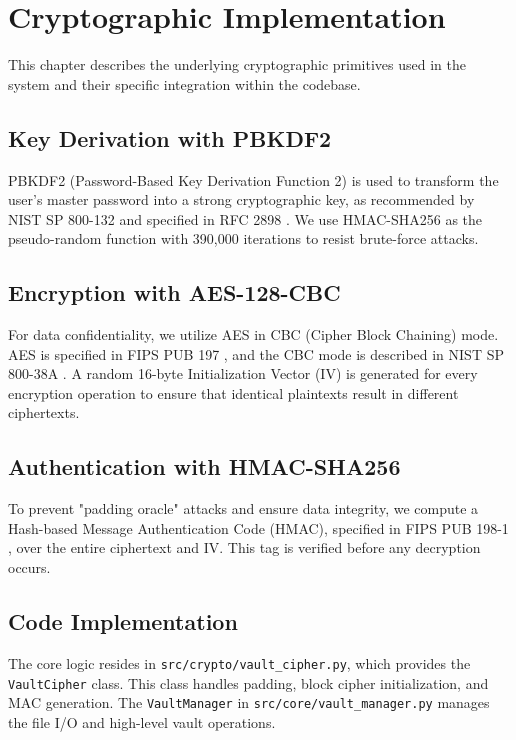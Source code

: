 \chapter{Cryptographic Implementation}
\label{ch:implementation}

This chapter describes the underlying cryptographic primitives used in the system and their specific integration within the codebase.

\section{Key Derivation with PBKDF2}
PBKDF2 (Password-Based Key Derivation Function 2) is used to transform the user's master password into a strong cryptographic key, as recommended by NIST SP 800-132 \cite{nist800132} and specified in RFC 2898 \cite{rfc2898}. We use HMAC-SHA256 as the pseudo-random function with 390,000 iterations to resist brute-force attacks.

\section{Encryption with AES-128-CBC}
For data confidentiality, we utilize AES in CBC (Cipher Block Chaining) mode. AES is specified in FIPS PUB 197 \cite{fips197}, and the CBC mode is described in NIST SP 800-38A \cite{nist80038a}. A random 16-byte Initialization Vector (IV) is generated for every encryption operation to ensure that identical plaintexts result in different ciphertexts.

\section{Authentication with HMAC-SHA256}
To prevent "padding oracle" attacks and ensure data integrity, we compute a Hash-based Message Authentication Code (HMAC), specified in FIPS PUB 198-1 \cite{fips198_1}, over the entire ciphertext and IV. This tag is verified before any decryption occurs.

\section{Code Implementation}
The core logic resides in \texttt{src/crypto/vault\_cipher.py}, which provides the \texttt{VaultCipher} class. This class handles padding, block cipher initialization, and MAC generation. The \texttt{VaultManager} in \texttt{src/core/vault\_manager.py} manages the file I/O and high-level vault operations.
